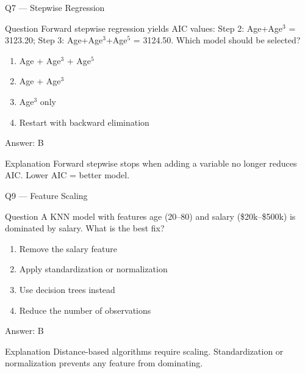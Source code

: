 \documentclass[aspectratio=169,8pt]{beamer}
\begin{document}
	\begin{frame}{Q7 --- Stepwise Regression}
		\begin{block}{Question}
			Forward stepwise regression yields AIC values: Step 2: Age+Age$^3$ = 3123.20; Step 3: Age+Age$^3$+Age$^5$ = 3124.50. Which model should be selected?
		\end{block}
		\begin{enumerate}
			\item Age + Age$^3$ + Age$^5$
			\item Age + Age$^3$
			\item Age$^3$ only
			\item Restart with backward elimination
		\end{enumerate}
		\begin{exampleblock}{Answer: B}\end{exampleblock}
		\begin{block}{Explanation}
			Forward stepwise stops when adding a variable no longer reduces AIC. Lower AIC = better model.
		\end{block}
	\end{frame}
	
	
	\begin{frame}{Q9 --- Feature Scaling}
		\begin{block}{Question}
			A KNN model with features age (20–80) and salary (\$20k–\$500k) is dominated by salary. What is the best fix?
		\end{block}
		\begin{enumerate}
			\item Remove the salary feature
			\item Apply standardization or normalization
			\item Use decision trees instead
			\item Reduce the number of observations
		\end{enumerate}
		\begin{exampleblock}{Answer: B}\end{exampleblock}
		\begin{block}{Explanation}
			Distance-based algorithms require scaling. Standardization or normalization prevents any feature from dominating.
		\end{block}
	\end{frame}
	
\end{document}
